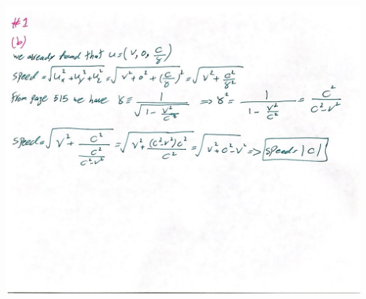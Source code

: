 \documentclass[fleqn]{article}
\begin{document}
\begin{enumerate}
    \pagebreak

    \begin{center}
      \includegraphics[height=16cm, width=17cm]{1B.JPG}
    \end{center}
    
    \pagebreak


\end{enumerate}
\end{document}
